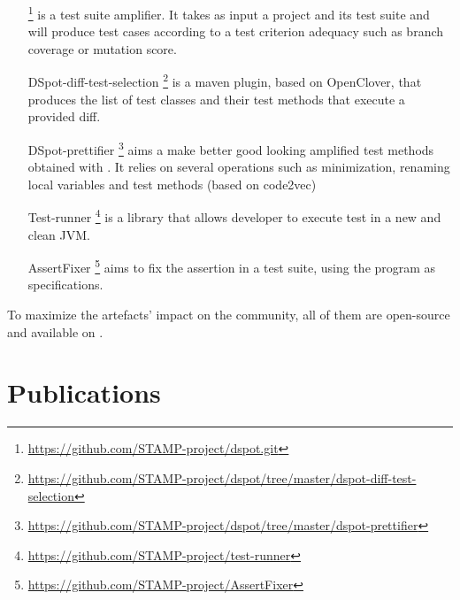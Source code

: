 \begin{itemize}
	\item[\dspot]\footnote{\url{https://github.com/STAMP-project/dspot.git}} is a test suite amplifier. 
	It takes as input a project and its test suite and will produce test cases according to a test criterion adequacy such as branch coverage or mutation score. 
	\item[DSpot-diff-test-selection]\footnote{\url{https://github.com/STAMP-project/dspot/tree/master/dspot-diff-test-selection}} is a maven plugin, based on OpenClover, that produces the list of test classes and their test methods that execute a provided diff.
	\item[DSpot-prettifier]\footnote{\url{https://github.com/STAMP-project/dspot/tree/master/dspot-prettifier}} aims a make better good looking amplified test methods obtained with \dspot. 
	It relies on several operations such as minimization, renaming local variables and test methods (based on code2vec)
	\item [Test-runner]\footnote{\url{https://github.com/STAMP-project/test-runner}} is a library that allows developer to execute test in a new and clean JVM. 
	\item[AssertFixer]\footnote{\url{https://github.com/STAMP-project/AssertFixer}} aims to fix the assertion in a test suite, using the program as specifications.
\end{itemize}

To maximize the artefacts' impact on the community, all of them are open-source and available on \gh.

\clearpage

\section{Publications}
\label{sec:intro:publications}

